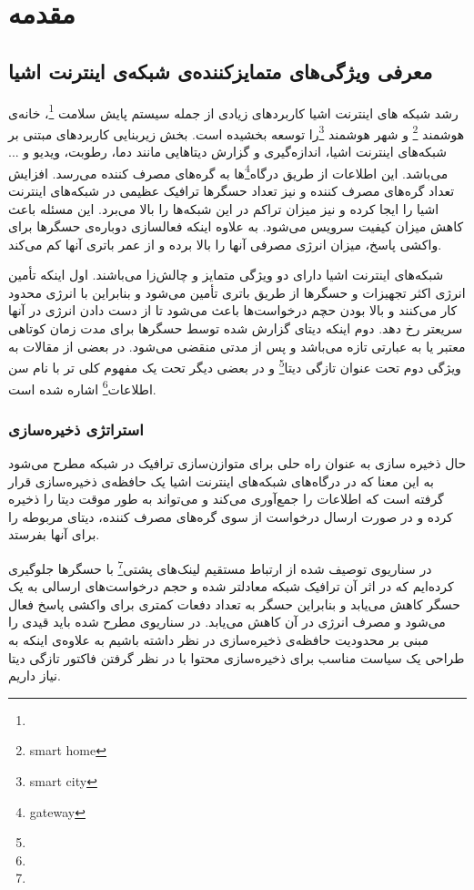 
\chapter{مقدمه}
\section{معرفی ویژگی‌های متمایزکننده‌ی شبکه‌ی اینترنت اشیا}
رشد شبکه های اینترنت اشیا کاربردهای زیادی از جمله سیستم پایش سلامت \footnote{}،‌ خانه‌ی هوشمند \footnote{smart home} و شهر هوشمند \footnote{smart city}را توسعه بخشیده است. بخش زیربنایی کاربردهای مبتنی بر شبکه‌های اینترنت اشیا، اندازه‌گیری و گزارش دیتاهایی مانند دما، رطوبت، ویدیو و ... می‌باشد. این اطلاعات از طریق درگاه‌\footnote{gateway}ها به گره‌های مصرف کننده می‌رسد. افزایش تعداد گره‌های مصرف کننده و نیز تعداد حسگرها ترافیک عظیمی در شبکه‌های اینترنت اشیا را ایجا کرده و نیز میزان تراکم در این شبکه‌ها را بالا می‌برد. این مسئله باعث کاهش میزان کیفیت سرویس می‌شود. به علاوه اینکه فعالسازی دوباره‌ی حسگرها برای واکشی پاسخ، میزان انرژی مصرفی آنها را بالا برده و از عمر باتری آنها کم می‌کند.

شبکه‌های اینترنت اشیا دارای دو ویژگی متمایز و چالش‌زا می‌باشند. اول اینکه تأمین انرژی اکثر تجهیزات و حسگرها از طریق باتری تأمین می‌شود و بنابراین با انرژی محدود کار می‌کنند و بالا بودن حچم درخواست‌ها باعث می‌شود تا از دست دادن انرژی در آنها سریعتر رخ دهد. دوم اینکه دیتای گزارش شده توسط حسگرها برای مدت زمان کوتاهی معتبر یا به عبارتی تازه می‌باشد و پس از مدتی منقضی می‌شود. در بعضی از مقالات به ویژگی دوم تحت عنوان تازگی دیتا\footnote{} و در بعضی دیگر تحت یک مفهوم کلی تر با نام سن اطلاعات\footnote{} اشاره شده است. 
\subsection{استراتژی ذخیره‌سازی}
حال ذخیره سازی به عنوان راه حلی برای متوازن‌سازی ترافیک در شبکه مطرح می‌شود به این معنا که در درگاه‌های شبکه‌های اینترنت اشیا یک حافظه‌ی ذخیره‌سازی قرار گرفته است که اطلاعات را جمع‌آوری می‌کند و می‌تواند به طور موقت دیتا را ذخیره کرده و در صورت ارسال درخواست از سوی گره‌های مصرف کننده، دیتای مربوطه را برای آنها بفرستد. 

در سناریوی توصیف شده از ارتباط مستقیم لینک‌های پشتی\footnote{} با حسگرها جلوگیری کرده‌ایم که در اثر آن ترافیک شبکه معادلتر شده و حجم درخواست‌های ارسالی به یک حسگر کاهش می‌یابد و بنابراین حسگر به تعداد دفعات کمتری برای واکشی پاسخ فعال می‌شود و مصرف انرژی در آن کاهش‌ می‌یابد. در سناریوی مطرح شده باید قیدی را مبنی بر محدودیت حافظه‌ی ذخیره‌سازی در نظر داشته باشیم به علاوه‌ی اینکه به طراحی یک سیاست مناسب برای ذخیره‌سازی محتوا با در نظر گرفتن فاکتور تازگی دیتا نیاز داریم.  

